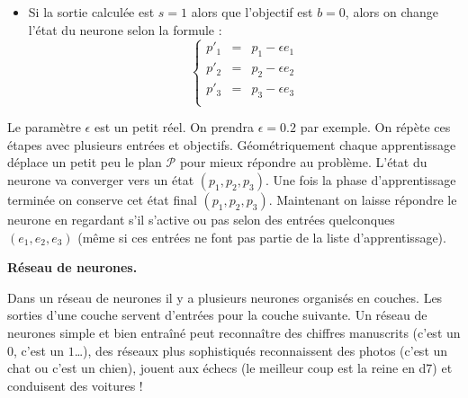 \documentclass[11pt,class=report,crop=false]{standalone}
\begin{document}
\begin{cours}[Neurone]
\begin{itemize}
	\item Si la sortie calculée est $s=1$ alors que l'objectif est $b=0$, alors on change l'état du neurone selon la formule :
$$\left\{ 
\begin{array}{rcl}
p'_1 &=& p_1 - \epsilon e_1 \\
p'_2 &=& p_2 - \epsilon e_2 \\
p'_3 &=& p_3 - \epsilon e_3 \\
\end{array}
\right.$$
\end{itemize}

Le paramètre $\epsilon$ est un petit réel. On prendra $\epsilon = 0.2$ par exemple.
On répète ces étapes avec plusieurs entrées et objectifs. Géométriquement chaque apprentissage déplace un petit peu le plan $\mathcal{P}$ pour mieux répondre au problème. L'état du neurone va converger vers un état $(p_1,p_2,p_3)$. 
Une fois la phase d'apprentissage terminée on conserve cet état final $(p_1,p_2,p_3)$. Maintenant 
on laisse répondre le neurone en regardant s'il s'active ou pas selon des entrées quelconques $(e_1,e_2,e_3)$ (même si ces entrées ne font pas partie de la liste d'apprentissage).


\medskip
\textbf{Réseau de neurones.}

Dans un réseau de neurones il y a plusieurs neurones organisés en couches. Les sorties d'une couche servent d'entrées pour la couche suivante. Un réseau de neurones simple et bien entraîné peut reconnaître des chiffres manuscrits (c'est un $0$, c'est un $1$\ldots), des réseaux plus sophistiqués reconnaissent des photos (c'est un chat ou c'est un chien), jouent aux échecs (le meilleur coup est
la reine en d7) et conduisent des voitures !


\end{cours}
\end{document}
